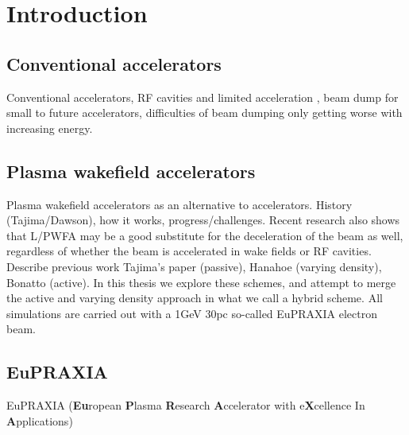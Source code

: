 \chapter{Introduction}
\section{Conventional accelerators}
Conventional accelerators, RF cavities and limited acceleration , beam dump for small to future accelerators, difficulties of beam dumping only getting worse with increasing energy. \\
\section{Plasma wakefield accelerators }
Plasma wakefield accelerators as an alternative to accelerators. History (Tajima/Dawson), how it works, progress/challenges. Recent research also shows that L/PWFA may be a good substitute for the deceleration of the beam as well, regardless of whether the beam is accelerated in wake fields or RF cavities. Describe previous work Tajima's paper (passive), Hanahoe (varying density), Bonatto (active). In this thesis we explore these schemes, and attempt to merge the active and varying density approach in what we call a hybrid scheme. All simulations are carried out with a 1GeV 30pc so-called EuPRAXIA electron beam. 
\section{EuPRAXIA}
EuPRAXIA (\textbf{Eu}ropean \textbf{P}lasma \textbf{R}esearch \textbf{A}ccelerator with e\textbf{X}cellence In \textbf{A}pplications)
